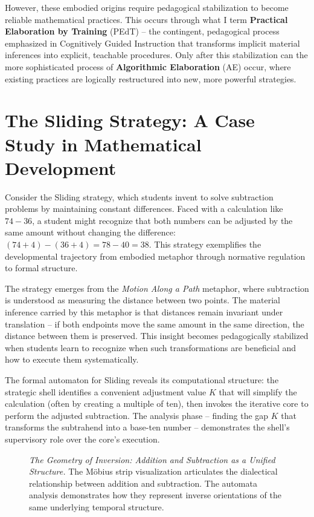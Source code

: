 \documentclass[12pt]{book}
\begin{document}
However, these embodied origins require pedagogical stabilization to become reliable mathematical practices. This occurs through what I term \textbf{Practical Elaboration by Training} (PEdT) -- the contingent, pedagogical process emphasized in Cognitively Guided Instruction that transforms implicit material inferences into explicit, teachable procedures. Only after this stabilization can the more sophisticated process of \textbf{Algorithmic Elaboration} (AE) occur, where existing practices are logically restructured into new, more powerful strategies.

\section{The Sliding Strategy: A Case Study in Mathematical Development}

Consider the Sliding strategy, which students invent to solve subtraction problems by maintaining constant differences. Faced with a calculation like $74 - 36$, a student might recognize that both numbers can be adjusted by the same amount without changing the difference: $(74 + 4) - (36 + 4) = 78 - 40 = 38$. This strategy exemplifies the developmental trajectory from embodied metaphor through normative regulation to formal structure.

The strategy emerges from the \textit{Motion Along a Path} metaphor, where subtraction is understood as measuring the distance between two points. The material inference carried by this metaphor is that distances remain invariant under translation -- if both endpoints move the same amount in the same direction, the distance between them is preserved. This insight becomes pedagogically stabilized when students learn to recognize when such transformations are beneficial and how to execute them systematically.

The formal automaton for Sliding reveals its computational structure: the strategic shell identifies a convenient adjustment value $K$ that will simplify the calculation (often by creating a multiple of ten), then invokes the iterative core to perform the adjusted subtraction. The analysis phase -- finding the gap $K$ that transforms the subtrahend into a base-ten number -- demonstrates the shell's supervisory role over the core's execution.

\begin{figure}[H]
    \centering
    \caption{\textit{The Geometry of Inversion: Addition and Subtraction as a Unified Structure.} The Möbius strip visualization articulates the dialectical relationship between addition and subtraction. The automata analysis demonstrates how they represent inverse orientations of the same underlying temporal structure.}
    \label{fig:geometry-inversion}
\end{figure}
\end{document}
